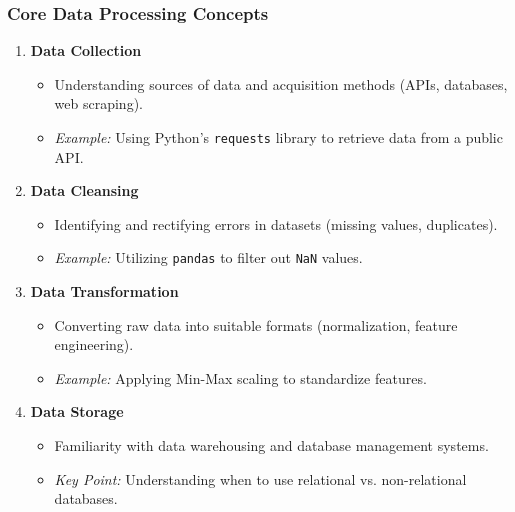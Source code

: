 \documentclass[aspectratio=169]{beamer}
\begin{document}
\begin{frame}[fragile]
    \frametitle{Core Data Processing Concepts}
    \begin{enumerate}
        \item \textbf{Data Collection}
            \begin{itemize}
                \item Understanding sources of data and acquisition methods (APIs, databases, web scraping).
                \item \textit{Example:} Using Python's \texttt{requests} library to retrieve data from a public API.
            \end{itemize}

        \item \textbf{Data Cleansing}
            \begin{itemize}
                \item Identifying and rectifying errors in datasets (missing values, duplicates).
                \item \textit{Example:} Utilizing \texttt{pandas} to filter out \texttt{NaN} values.
            \end{itemize}

        \item \textbf{Data Transformation}
            \begin{itemize}
                \item Converting raw data into suitable formats (normalization, feature engineering).
                \item \textit{Example:} Applying Min-Max scaling to standardize features.
            \end{itemize}

        \item \textbf{Data Storage}
            \begin{itemize}
                \item Familiarity with data warehousing and database management systems.
                \item \textit{Key Point:} Understanding when to use relational vs. non-relational databases.
            \end{itemize}
    \end{enumerate}
\end{frame}
\end{document}

